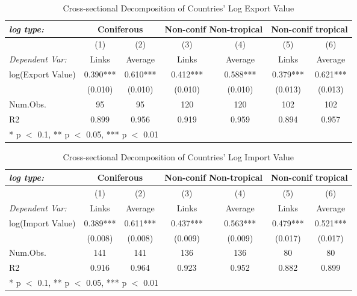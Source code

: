 \documentclass[a4paper,12pt]{article}
\begin{document}
\begin{table}[H]
    \centering
    \caption{Cross-sectional Decomposition of Countries' Log Export Value}
    \begin{tabular}[t]{lcccccc}
    \toprule
    \textit{log type:} &  \multicolumn{2}{c}{Coniferous}&  \multicolumn{2}{c}{Non-conif Non-tropical}&  \multicolumn{2}{c}{Non-conif tropical}\\
    \midrule
      & (1) & (2) & (3) & (4) & (5) & (6)\\
      \textit{Dependent Var:}& Links & Average & Links & Average & Links & Average \\
    \midrule
    log(Export Value)  & \num{0.390}*** & \num{0.610}*** & \num{0.412}*** & \num{0.588}*** & \num{0.379}*** & \num{0.621}***\\
    & (\num{0.010}) & (\num{0.010}) & (\num{0.010}) & (\num{0.010}) & (\num{0.013}) & (\num{0.013})\\
   \midrule
   Num.Obs. & \num{95} & \num{95} & \num{120} & \num{120} & \num{102} & \num{102}\\
   R2 & \num{0.899} & \num{0.956} & \num{0.919} & \num{0.959} & \num{0.894} & \num{0.957}\\
   \bottomrule
   \multicolumn{7}{l}{\rule{0pt}{1em}* p $<$ 0.1, ** p $<$ 0.05, *** p $<$ 0.01}\\
   \end{tabular}
   \end{table}

\begin{table}[H]
    \centering
    \caption{Cross-sectional Decomposition of Countries' Log Import Value}
    \begin{tabular}[t]{lcccccc}
    \toprule
    \textit{log type:} &  \multicolumn{2}{c}{Coniferous}&  \multicolumn{2}{c}{Non-conif Non-tropical}&  \multicolumn{2}{c}{Non-conif tropical}\\
    \midrule
      & (1) & (2) & (3) & (4) & (5) & (6)\\
      \textit{Dependent Var:}& Links & Average & Links & Average & Links & Average \\
    \midrule
    log(Import Value) & \num{0.389}*** & \num{0.611}*** & \num{0.437}*** & \num{0.563}*** & \num{0.479}*** & \num{0.521}***\\
    & (\num{0.008}) & (\num{0.008}) & (\num{0.009}) & (\num{0.009}) & (\num{0.017}) & (\num{0.017})\\
   \midrule
   Num.Obs. & \num{141} & \num{141} & \num{136} & \num{136} & \num{80} & \num{80}\\
   R2 & \num{0.916} & \num{0.964} & \num{0.923} & \num{0.952} & \num{0.882} & \num{0.899}\\
   \bottomrule
   \multicolumn{7}{l}{\rule{0pt}{1em}* p $<$ 0.1, ** p $<$ 0.05, *** p $<$ 0.01}\\
   \end{tabular}
   \end{table}
\end{document}
